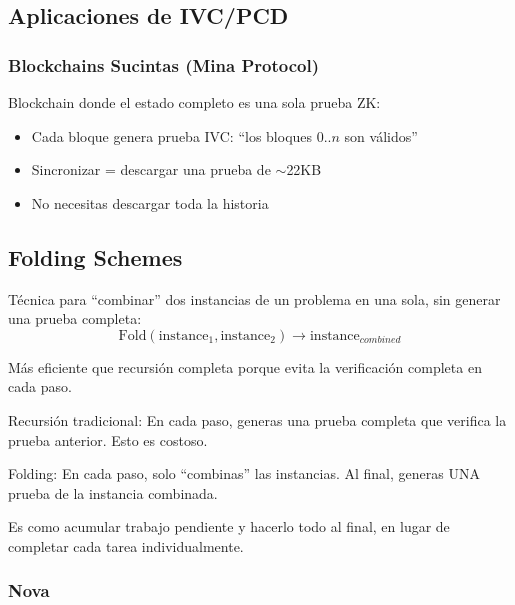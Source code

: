 \documentclass[11pt,a4paper,twoside]{book}
\begin{document}
\subsection{Aplicaciones de IVC/PCD}

\subsubsection{Blockchains Sucintas (Mina Protocol)}

\begin{definition}
Blockchain donde el estado completo es una sola prueba ZK:
\begin{itemize}
    \item Cada bloque genera prueba IVC: ``los bloques $0..n$ son v\'alidos''
    \item Sincronizar = descargar una prueba de $\sim$22KB
    \item No necesitas descargar toda la historia
\end{itemize}
\end{definition}

\subsection{Folding Schemes}

\begin{definition}[Folding]
T\'ecnica para ``combinar'' dos instancias de un problema en una sola, sin generar una prueba completa:
\[
\text{Fold}(\text{instance}_1, \text{instance}_2) \to \text{instance}_{combined}
\]

M\'as eficiente que recursi\'on completa porque evita la verificaci\'on completa en cada paso.
\end{definition}

\begin{intuicion}
Recursi\'on tradicional: En cada paso, generas una prueba completa que verifica la prueba anterior. Esto es costoso.

Folding: En cada paso, solo ``combinas'' las instancias. Al final, generas UNA prueba de la instancia combinada.

Es como acumular trabajo pendiente y hacerlo todo al final, en lugar de completar cada tarea individualmente.
\end{intuicion}

\subsubsection{Nova}
\end{document}
